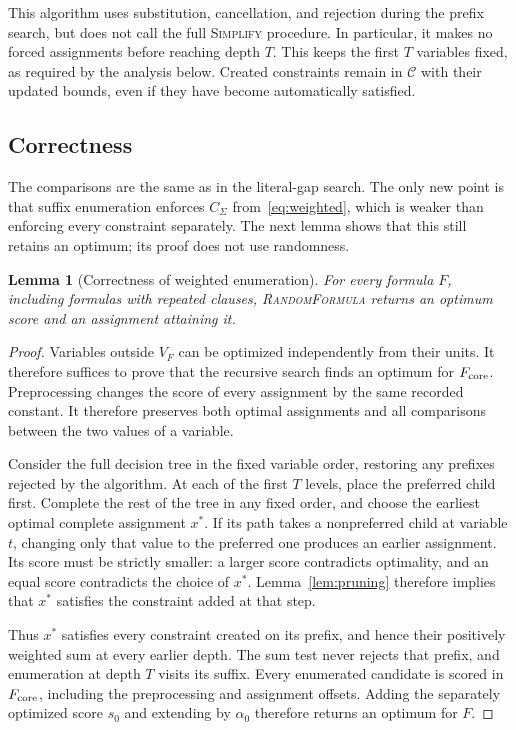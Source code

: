 \documentclass[11pt,a4paper]{article}
\newtheorem{lemma}[theorem]{Lemma}
\theoremstyle{definition}
\theoremstyle{remark}
\begin{document}
This algorithm uses substitution, cancellation, and rejection during the
prefix search, but does not call the full \textnormal{\textsc{Simplify}}
procedure. In particular, it makes no forced assignments before reaching
depth $T$. This keeps the first $T$ variables fixed, as required by the
analysis below. Created constraints remain in $\mathcal C$ with their
updated bounds, even if they have become automatically satisfied.

\subsection{Correctness}

The comparisons are the same as in the literal-gap search. The only new
point is that suffix enumeration enforces $C_\Sigma$ from~\eqref{eq:weighted}, which is
weaker than enforcing every constraint separately. The next lemma shows
that this still retains an optimum; its proof does not use randomness.

\begin{lemma}[Correctness of weighted enumeration]\label{lem:exactA}
For every formula $F$, including formulas with repeated
clauses, \textnormal{\textsc{RandomFormula}} returns an optimum score and
an assignment attaining it.
\end{lemma}
\begin{proof}
Variables outside $V_F$ can be optimized independently from their units.
It therefore suffices to prove that the recursive search finds an optimum
for $F_{\rm core}$. Preprocessing changes the score of every assignment
by the same recorded constant. It therefore preserves both optimal assignments and all
comparisons between the two values of a variable.

Consider the full decision tree in the fixed variable order, restoring
any prefixes rejected by the algorithm. At each of the first $T$ levels,
place the preferred child first. Complete the rest of the tree in any
fixed order, and choose the earliest optimal complete assignment $x^*$.
If its path takes a nonpreferred child at variable $t$, changing only
that value to the preferred one produces an earlier assignment. Its
score must be strictly smaller: a larger score contradicts optimality,
and an equal score contradicts the choice of $x^*$.
Lemma~\ref{lem:pruning} therefore implies that $x^*$ satisfies the
constraint added at that step.

Thus $x^*$ satisfies every constraint created on its prefix, and hence
their positively weighted sum at every earlier depth. The sum test never
rejects that prefix, and enumeration at depth $T$ visits its suffix.
Every enumerated candidate is scored in $F_{\rm core}$, including
the preprocessing and assignment offsets. Adding the separately optimized
score $s_0$ and extending by $\alpha_0$ therefore returns an optimum for $F$.
\end{proof}
\end{document}
